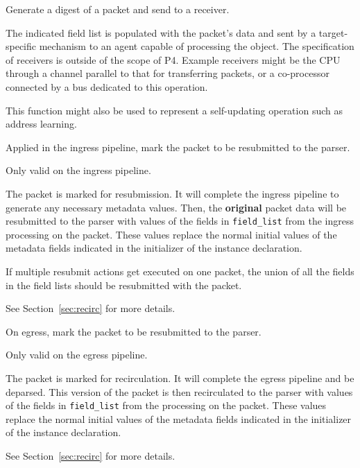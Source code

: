 \documentclass[12pt]{article}
\begin{document}

{ %
Generate a digest of a packet and send to a receiver.
}
{ %
}
{ %
The indicated field list is populated with the packet's data and sent by 
a target-specific mechanism to an agent capable of processing the object. 
 The specification of receivers is outside of the scope of P4. Example receivers 
might be the CPU through a channel parallel to that for transferring packets, 
or a co-processor connected by a bus dedicated to this operation. 

This function might also be used to represent a self-updating operation such 
as address learning.
}


{%
Applied in the ingress pipeline, mark the packet to be resubmitted to the 
parser.
}
{ %
}
{ %
Only valid on the ingress pipeline.

The packet is marked for resubmission. It will complete the ingress pipeline 
to generate any necessary metadata values. Then, the \textbf{original} packet data 
will be resubmitted to the parser with values of the fields in \texttt{field_list} from 
the ingress processing on the packet. These values replace the normal initial 
values of the metadata fields indicated in the initializer of the instance 
declaration.

If multiple resubmit actions get executed on one packet, the union of all 
the fields in the field lists should be resubmitted with the packet.

See Section~\ref{sec:recirc} for more details.

}


{ %
On egress, mark the packet to be resubmitted to the parser.
}
{ %
}
{ %
Only valid on the egress pipeline.

The packet is marked for recirculation. It will complete the egress pipeline 
and be deparsed.  This version of the packet is then recirculated to the parser 
with values of the fields in \texttt{field_list} from the processing on the packet. 
These values replace the normal initial values of the metadata fields indicated 
in the initializer of the instance declaration.

See Section~\ref{sec:recirc} for more details.

}
\end{document}
